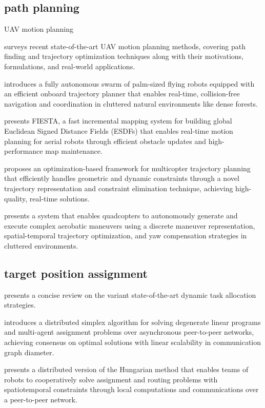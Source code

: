 \subsection{path planning}

UAV motion planning

\cite{quan2020survey} surveys recent state-of-the-art UAV motion planning methods, covering path finding and trajectory optimization techniques along with their motivations, formulations, and real-world applications.

\cite{zhou2022swarm} introduces a fully autonomous swarm of palm-sized flying robots equipped with an efficient onboard trajectory planner that enables real-time, collision-free navigation and coordination in cluttered natural environments like dense forests.

\cite{han2019fiesta} presents FIESTA, a fast incremental mapping system for building global Euclidean Signed Distance Fields (ESDFs) that enables real-time motion planning for aerial robots through efficient obstacle updates and high-performance map maintenance.

\cite{wang2022geometrically} proposes an optimization-based framework for multicopter trajectory planning that efficiently handles geometric and dynamic constraints through a novel trajectory representation and constraint elimination technique, achieving high-quality, real-time solutions.

\cite{wang2025unlocking} presents a system that enables quadcopters to autonomously generate and execute complex aerobatic maneuvers using a discrete maneuver representation, spatial-temporal trajectory optimization, and yaw compensation strategies in cluttered environments.


\subsection{target position assignment}

\cite{rm2020review} presents a concise review on the variant state-of-the-art dynamic task allocation strategies.

\cite{burger2012distributed} introduces a distributed simplex algorithm for solving degenerate linear programs and multi-agent assignment problems over asynchronous peer-to-peer networks, achieving consensus on optimal solutions with linear scalability in communication graph diameter.

\cite{chopra2017distributed} presents a distributed version of the Hungarian method that enables teams of robots to cooperatively solve assignment and routing problems with spatiotemporal constraints through local computations and communications over a peer-to-peer network.

